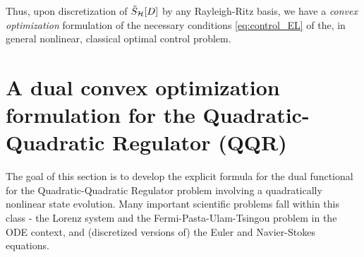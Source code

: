 \documentclass[11pt]{article}
\begin{document}
Thus, upon discretization of $\tilde{S}_{\mathcal{H}}[D]$ by any Rayleigh-Ritz basis, we have a \emph{convex optimization} formulation of the necessary conditions \eqref{eq:control_EL} of the, in general nonlinear, classical optimal control problem.

\section{A dual convex optimization formulation for the Quadratic-\\Quadratic Regulator (QQR)}\label{sec:QQR}
The goal of this section is to develop the explicit formula for the dual functional for the Quadratic-Quadratic Regulator problem \cite{borggaard2020quadratic,krener} involving a quadratically nonlinear state evolution. Many important scientific problems fall within this class - the Lorenz system \cite{lorenz1963deterministic} and the Fermi-Pasta-Ulam-Tsingou problem \cite{fermi1955studies} in the ODE context, and (discretized versions of) the Euler and Navier-Stokes equations.
\end{document}
